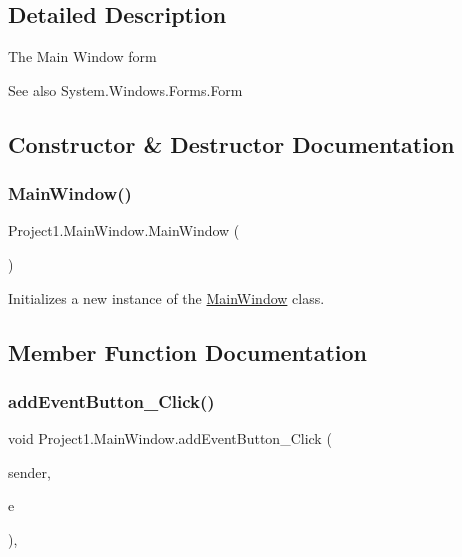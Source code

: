 \subsection{Detailed Description}
The Main Window form 

\begin{DoxySeeAlso}{See also}
System.\+Windows.\+Forms.\+Form


\end{DoxySeeAlso}


\subsection{Constructor \& Destructor Documentation}
\mbox{\label{classProject1_1_1MainWindow_ac8ada21cf001233b859c3c8fd34dbd14}} 
\subsubsection{\texorpdfstring{Main\+Window()}{MainWindow()}}
{\footnotesize\ttfamily Project1.\+Main\+Window.\+Main\+Window (\begin{DoxyParamCaption}{ }\end{DoxyParamCaption})\hspace{0.3cm}{\ttfamily [inline]}}



Initializes a new instance of the \hyperlink{classProject1_1_1MainWindow}{Main\+Window} class. 



\subsection{Member Function Documentation}
\mbox{\label{classProject1_1_1MainWindow_acddeca5d53ed4be2a81351d1681b4cb5}} 
\subsubsection{\texorpdfstring{add\+Event\+Button\+\_\+\+Click()}{addEventButton\_Click()}}
{\footnotesize\ttfamily void Project1.\+Main\+Window.\+add\+Event\+Button\+\_\+\+Click (\begin{DoxyParamCaption}\item[{object}]{sender,  }\item[{Event\+Args}]{e }\end{DoxyParamCaption})\hspace{0.3cm}{\ttfamily [inline]}, {\ttfamily [private]}}



